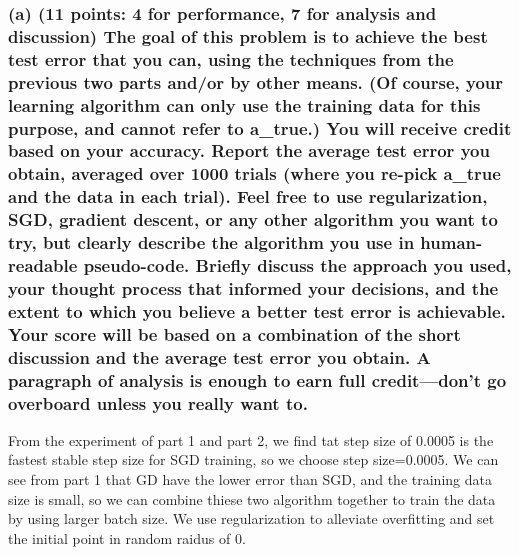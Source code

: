 \documentclass[11pt]{article}
\begin{document}
    \subsubsection{(a) (11 points: 4 for performance, 7 for analysis and
discussion) The goal of this problem is to achieve the best test error
that you can, using the techniques from the previous two parts and/or by
other means. (Of course, your learning algorithm can only use the
training data for this purpose, and cannot refer to a\_true.) You will
receive credit based on your accuracy. Report the average test error you
obtain, averaged over 1000 trials (where you re-pick a\_true and the
data in each trial). Feel free to use regularization, SGD, gradient
descent, or any other algorithm you want to try, but clearly describe
the algorithm you use in human-readable pseudo-code. Briefly discuss the
approach you used, your thought process that informed your decisions,
and the extent to which you believe a better test error is achievable.
Your score will be based on a combination of the short discussion and
the average test error you obtain. A paragraph of analysis is enough to
earn full credit---don't go overboard unless you really want
to.}\label{a-11-points-4-for-performance-7-for-analysis-and-discussion-the-goal-of-this-problem-is-to-achieve-the-best-test-error-that-you-can-using-the-techniques-from-the-previous-two-parts-andor-by-other-means.-of-course-your-learning-algorithm-can-only-use-the-training-data-for-this-purpose-and-cannot-refer-to-a_true.-you-will-receive-credit-based-on-your-accuracy.-report-the-average-test-error-you-obtain-averaged-over-1000-trials-where-you-re-pick-a_true-and-the-data-in-each-trial.-feel-free-to-use-regularization-sgd-gradient-descent-or-any-other-algorithm-you-want-to-try-but-clearly-describe-the-algorithm-you-use-in-human-readable-pseudo-code.-briefly-discuss-the-approach-you-used-your-thought-process-that-informed-your-decisions-and-the-extent-to-which-you-believe-a-better-test-error-is-achievable.-your-score-will-be-based-on-a-combination-of-the-short-discussion-and-the-average-test-error-you-obtain.-a-paragraph-of-analysis-is-enough-to-earn-full-creditdont-go-overboard-unless-you-really-want-to.}

    From the experiment of part 1 and part 2, we find tat step size of
0.0005 is the fastest stable step size for SGD training, so we choose
step size=0.0005. We can see from part 1 that GD have the lower error
than SGD, and the training data size is small, so we can combine thiese
two algorithm together to train the data by using larger batch size. We
use regularization to alleviate overfitting and set the initial point in
random raidus of 0.
\end{document}

